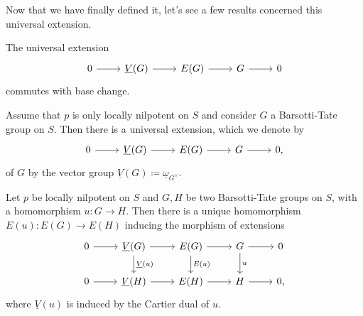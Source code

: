\documentclass[../Main]{subfiles}
\begin{document}
\noindent
Now that we have finally defined it, let's see
a few results concerned this universal extension.


\begin{lem}
	The universal extension 
	\begin{equation*}
	\begin{tikzcd}
		0 \arrow[r, "", rightarrow] &
		\underline{V}(G) \arrow[r, "", rightarrow] &
		E(G) \arrow[r, "", rightarrow] &
		G \arrow[r, "", rightarrow] &
		0
	\end{tikzcd}
	\end{equation*}
	commutes with base change.
\end{lem} 


\begin{lem}
	Assume that $p$ is only locally nilpotent on $S$
	and consider $G$ a Barsotti-Tate group on $S$.
	Then there is a universal extension, which we denote by
	\begin{equation*}
	\begin{tikzcd}
		0 \arrow[r, "", rightarrow] &
		\underline{V}(G) \arrow[r, "", rightarrow] &
		E(G) \arrow[r, "", rightarrow] &
		G \arrow[r, "", rightarrow] &
		0
	,\end{tikzcd}
	\end{equation*}
	of $G$ by the vector group
	$\underline{V}(G) \coloneqq \underline{\omega}_{G^\vee}$.
\end{lem} 


\begin{prop}\label{prop:MorUnivExts}
	Let $p$ be locally nilpotent on $S$ and $G,H$ be two
	Barsotti-Tate groups on $S$, with a homomorphism $u\colon G \to H$.
	Then there is a unique homomorphism
	$E(u)\colon E(G) \to E(H)$ inducing the morphism of extensions
	\begin{equation*}
	\begin{tikzcd}
		0 \arrow[r, "", rightarrow] &
		\underline{V}(G) \arrow[r, "", rightarrow] 
		\arrow[d, "\underline{V}(u)", rightarrow] &
		E(G) \arrow[r, "", rightarrow] 
		\arrow[d, "E(u)", rightarrow] &
		G \arrow[r, "", rightarrow] 
		\arrow[d, "u", rightarrow] &
		0\\
		0 \arrow[r, "", rightarrow] &
		\underline{V}(H) \arrow[r, "", rightarrow] &
		E(H) \arrow[r, "", rightarrow] &
		H \arrow[r, "", rightarrow] &
		0
	,\end{tikzcd}
	\end{equation*}
	where $\underline{V}(u)$ is induced by the Cartier dual of $u$.
\end{prop} 
\end{document}
